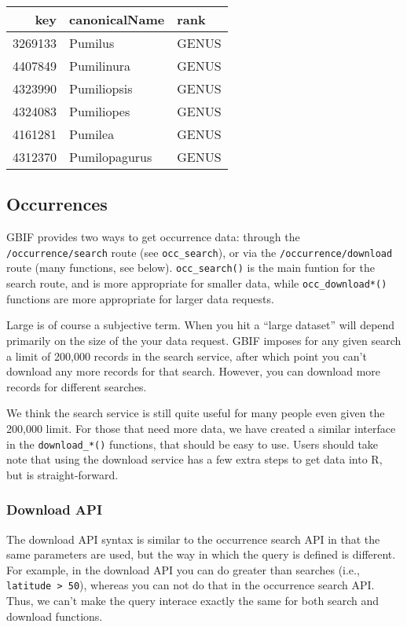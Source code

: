 \documentclass[author-year, review, 11pt]{components/elsarticle} %
\begin{document}
\begin{longtable}[c]{@{}rll@{}}
\toprule
key & canonicalName & rank\tabularnewline
\midrule
\endhead
3269133 & Pumilus & GENUS\tabularnewline
4407849 & Pumilinura & GENUS\tabularnewline
4323990 & Pumiliopsis & GENUS\tabularnewline
4324083 & Pumiliopes & GENUS\tabularnewline
4161281 & Pumilea & GENUS\tabularnewline
4312370 & Pumilopagurus & GENUS\tabularnewline
\bottomrule
\end{longtable}

\subsection{Occurrences}\label{occurrences}

GBIF provides two ways to get occurrence data: through the
\texttt{/occurrence/search} route (see \texttt{occ\_search}), or via the
\texttt{/occurrence/download} route (many functions, see below).
\texttt{occ\_search()} is the main funtion for the search route, and is
more appropriate for smaller data, while \texttt{occ\_download*()}
functions are more appropriate for larger data requests.

Large is of course a subjective term. When you hit a ``large dataset''
will depend primarily on the size of the your data request. GBIF imposes
for any given search a limit of 200,000 records in the search service,
after which point you can't download any more records for that search.
However, you can download more records for different searches.

We think the search service is still quite useful for many people even
given the 200,000 limit. For those that need more data, we have created
a similar interface in the \texttt{download\_*()} functions, that should
be easy to use. Users should take note that using the download service
has a few extra steps to get data into R, but is straight-forward.

\subsubsection{Download API}\label{download-api}

The download API syntax is similar to the occurrence search API in that
the same parameters are used, but the way in which the query is defined
is different. For example, in the download API you can do greater than
searches (i.e., \texttt{latitude \textgreater{} 50}), whereas you can
not do that in the occurrence search API. Thus, we can't make the query
interace exactly the same for both search and download functions.
\end{document}

